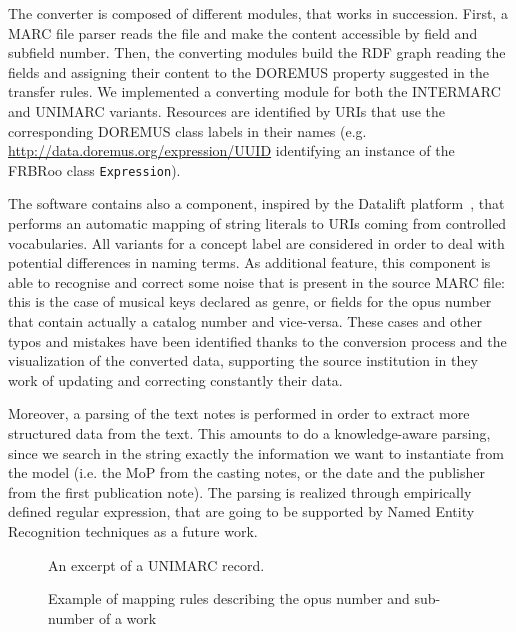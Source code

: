The converter is composed of different modules, that works in succession. First, a MARC file parser reads the file and make the content accessible by field and subfield number. Then, the converting modules build the RDF graph reading the fields and assigning their content to the DOREMUS property suggested in the transfer rules. We implemented a converting module for both the INTERMARC and UNIMARC variants. Resources are identified by URIs that use the corresponding DOREMUS class labels in their names (e.g. \url{http://data.doremus.org/expression/UUID} identifying an instance of the FRBRoo class \texttt{Expression}).

The software contains also a  component, inspired by the Datalift platform~\cite{scharffe2012enabling}, that performs an automatic mapping of string literals to URIs coming from controlled vocabularies. All variants for a concept label are considered in order to deal with potential differences in naming terms. As additional feature, this component is able to recognise and correct some noise that is present in the source MARC file: this is the case of musical keys declared as genre, or fields for the opus number that contain actually a catalog number and vice-versa. These cases and other typos and mistakes have been identified thanks to the conversion process and the visualization of the converted data, supporting the source institution in they work of updating and correcting constantly their data.

Moreover, a parsing of the text notes is performed in order to extract more structured data from the text. This amounts to do a knowledge-aware parsing, since we search in the string exactly the information we want to instantiate from the model (i.e. the MoP from the casting notes, or the date and the publisher from the first publication note). The parsing is realized through empirically defined regular expression, that are going to be supported by Named Entity Recognition techniques as a future work.

\begin{figure}
 \centerline{}
  \caption{An excerpt of a UNIMARC record.}
 \label{fig:unimarc}
 \smallskip
 \centerline{}
  \caption{Example of mapping rules describing the opus number and sub-number of a work}
 \label{fig:mappings}
\end{figure}

